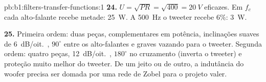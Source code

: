 \begin{solution}{pb:b1:filters-transfer-functions:1}
\textbf{24.} $U = \sqrt{PR} = \sqrt{400} = \qty{20}{V}$ eficazes. Em $f_c$ cada
alto-falante recebe metade: \qty{25}{W}. A \qty{500}{Hz} o tweeter recebe $6\%$:
\qty{3}{W}.

\textbf{25.} Primeira ordem: duas peças, complementares em potência, inclinações suaves de
\qty{6}{dB/oit.}, $90^\circ$ entre os alto-falantes e graves vazando para o
tweeter. Segunda ordem: quatro peças, \qty{12}{dB/oit.}, $180^\circ$ no
cruzamento (inverta o tweeter) e proteção muito melhor do tweeter. De um jeito
ou de outro, a indutância do woofer precisa ser domada por uma rede de Zobel para o
projeto valer.
\end{solution}
